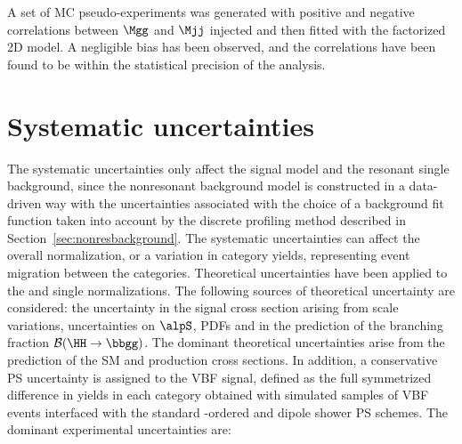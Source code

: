 \documentclass[11pt,a4paper,cmspaper,final,collab]{cms-tdr}
\begin{document}
A set of MC pseudo-experiments was generated with positive and negative correlations between $\Mgg$ and $\Mjj$ injected and then fitted with the factorized 2D model. A negligible bias has been observed, and the correlations have been found to be within the statistical precision of the analysis.

\section{Systematic uncertainties}
\label{sec:syst}
The systematic uncertainties only affect the signal model
 and the resonant single \PH background, since the nonresonant background model is constructed in a data-driven way with the
 uncertainties associated with the choice of a background fit function taken into account by the discrete profiling method described
 in Section~\ref{sec:nonresbackground}. The systematic uncertainties can affect the overall normalization, or a variation in category yields, representing event migration between the categories. Theoretical uncertainties have been applied to the \HH and single \PH normalizations. The following sources of theoretical uncertainty are considered: the uncertainty in the signal cross section arising from scale variations, uncertainties on $\alpS$, PDFs and in the prediction of the branching fraction $\mathcal{B}(\HH\to\bbgg)$. 
 The dominant theoretical uncertainties arise from the prediction of the SM \HH and \ttH production cross sections. 
In addition, a conservative PS uncertainty is assigned to the VBF \HH signal, defined as the full symmetrized difference in yields in each category obtained with simulated samples of VBF \HH events interfaced with the standard \pt-ordered and dipole shower PS schemes. 
The dominant experimental uncertainties are:
\end{document}
